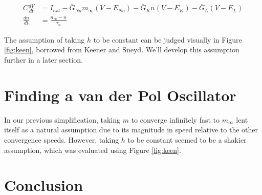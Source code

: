\documentclass{article}
\begin{document}
\begin{align*}
        C\frac{dV}{dt} &= I_{ext} -\bar{G}_{Na}m_\infty(V-E_{Na}) -\bar{G}_{K}n(V-E_{K})  -\bar{G}_{L}(V-E_{L}) \\
    \frac{dn}{dt} &= \frac{n_{\infty}-n}{\tau_n} 
\end{align*}

The assumption of taking $h$ to be constant can be judged visually in Figure \ref{fig:keen}, borrowed from Keener and Sneyd\cite{keener}. We'll develop this assumption further in a later section.

\section{Finding a van der Pol Oscillator}

In our previous simplification, taking $m$ to converge infinitely fast to $m_\infty$ lent itself as a natural assumption due to its magnitude in speed relative to the other convergence speeds. However, taking $h$ to be constant seemed to be a shakier assumption, which was evaluated using Figure \ref{fig:keen}. 

\section{Conclusion}



\nocite{*}
\end{document}
